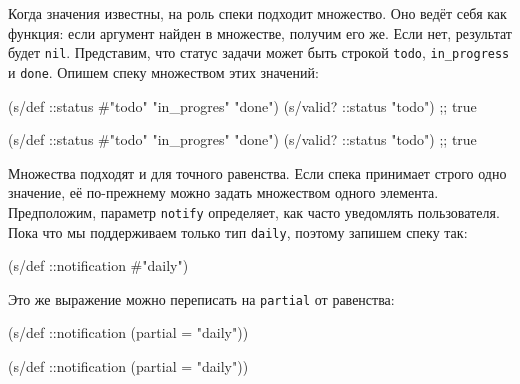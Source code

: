 Когда значения известны, на роль спеки подходит множество. Оно ведёт себя как
функция: если аргумент найден в множестве, получим его же. Если нет, результат
будет \verb|nil|. Представим, что статус задачи может быть строкой
\verb|todo|, \verb|in_progress| и \verb|done|. Опишем спеку множеством
этих значений:

\ifx\DEVICETYPE\MOBILE

\begin{english}
  \begin{clojure}
(s/def ::status
  #{"todo" "in_progres" "done"})
(s/valid? ::status "todo") ;; true
  \end{clojure}
\end{english}

\else

\begin{english}
  \begin{clojure}
(s/def ::status #{"todo" "in_progres" "done"})
(s/valid? ::status "todo") ;; true
  \end{clojure}
\end{english}

\fi

Множества подходят и для точного равенства. Если спека принимает строго одно
значение, её по-прежнему можно задать множеством одного
элемента. Предположим, параметр \verb|notify| определяет, как часто уведомлять
пользователя. Пока что мы поддерживаем только тип \verb|daily|, поэтому
запишем спеку так:

\begin{english}
  \begin{clojure}
(s/def ::notification #{"daily"})
  \end{clojure}
\end{english}

\noindent
Это же выражение можно переписать на \verb|partial| от равенства:

\ifx\DEVICETYPE\MOBILE

\begin{english}
  \begin{clojure}
(s/def ::notification
  (partial = "daily"))
  \end{clojure}
\end{english}

\else

\begin{english}
  \begin{clojure}
(s/def ::notification (partial = "daily"))
  \end{clojure}
\end{english}


